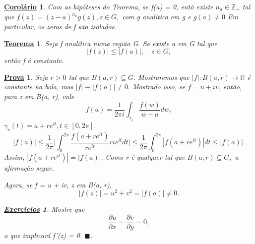 \documentclass{article}
\newtheorem*{theorem*}{\underline{Teorema}}
\newtheorem*{proof*}{\underline{Prova}}
\newtheorem*{crl*}{\underline{Corol\'ario}}
\newtheorem*{exer*}{\underline{Exerc\'icios}}
\renewcommand\qedsymbol{$\blacksquare$}
\begin{document}
  \begin{crl*}
    Com as hip\'oteses do Teorema, se f(a) = 0, ent\~o existe $n_a\in \mathbb{Z}_{+}$ tal que $f(z) = (z-a)^{n_a}g(z), z\in{G},$
    com g anal\'itica em g e $g(a)\neq0$ Em particular, os zeros de f s\~ao isolados.
  \end{crl*}
  \begin{theorem*}
    Seja f anal\'itica numa regi\~ao G. Se existe a em G tal que 
    $$
    |f(z)|\leq|f(a)|, \quad z\in{G},
    $$
    ent\~ao f \'e constante.
  \end{theorem*} 
  \begin{proof*}
    Seja $r > 0$ tal que $B(a, r)\subseteq{G}.$ Mostraremos que $|f|:B(a, r)\rightarrow \mathbb{R}$ \'e constante na bola, mas $|f|\equiv|f(a)|\neq0.$
    Mostrado isso, se $f = u + iv$, ent\~ao, para z em B(a, r), vale 
    $$
    f(a) = \frac{1}{2\pi i}\int_{\gamma_{v}}^{}\frac{f(w)}{w-a}dw,
    $$
    $\gamma_{v}(t) = a + re^{it}, t\in[0, 2\pi].$
    $$
    |f(a)|\leq \frac{1}{2\pi}\biggl|\int_{0}^{2\pi}\frac{f(a + re^{it})}{re^{it}}rie^{it}dt\biggr|\leq \frac{1}{2\pi}\int_{0}^{2\pi}|f(a + re^{it})|dt
    \leq |f(a)|.
    $$
    Assim, $|f(a+re^{it})| = |f(a)|.$ Como r \'e qualquer tal que $B(a, r)\subseteq{G},$ a afirma\c c\~ao segue.

    Agora, se f = u + iv, z em B(a, r),
    $$
    |f(z)| = u^{2} + v^{2} = |f(a)|\neq 0.
    $$
    \begin{exer*}
      Mostre que 
      $$
      \frac{\partial{u}}{\partial{x}} = \frac{\partial{v}}{\partial{y}} = 0,
      $$
      o que implicar\'a f'(z) = 0. \qedsymbol.
    \end{exer*}
  \end{proof*}
\end{document}
